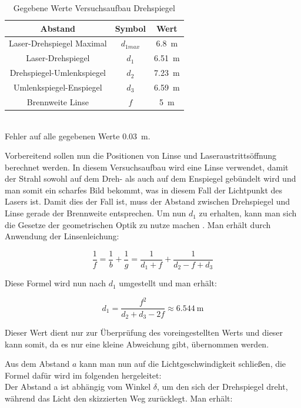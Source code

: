 \begin{table}[h]
    \centering
    \caption{Gegebene Werte Versuchsaufbau Drehspiegel}
    \begin{tabular}{c c c}
    \hline
    Abstand & Symbol & Wert \\
    \hline
    Laser-Drehspiegel Maximal & $d_{1max}$ & \SI{6.8}{\metre} \\
    Laser-Drehspiegel & $d_1$ & \SI{6.51}{\metre}\\
    Drehspiegel-Umlenkspiegel & $d_2$ & \SI{7.23}{\metre}\\
    Umlenkspiegel-Enspiegel & $d_3$ & \SI{6.59}{\metre}\\
    Brennweite Linse & $f$ & \SI{5}{\metre}\\
    
    \hline
    \end{tabular}
    \label{tab:Drehspiegel vorgegebene Werte}\\
    Fehler auf alle gegebenen Werte \SI{0.03}{\metre}.
\end{table}

Vorbereitend sollen nun die Positionen von Linse und Laseraustrittsöffnung berechnet werden. In diesem Versuchsaufbau wird eine Linse verwendet, damit der Strahl sowohl auf dem Dreh- als auch auf dem Enspiegel gebündelt wird und man somit ein scharfes Bild bekommt, was in diesem Fall der Lichtpunkt des Lasers ist. Damit dies der Fall ist, muss der Abstand zwischen Drehspiegel und Linse gerade der Brennweite entsprechen. Um nun $d_1$ zu erhalten, kann man sich die Gesetze der geometrischen Optik zu nutze machen \cite{2}. Man erhält durch Anwendung der Linsenleichung: 

\begin{equation}
    \frac{1}{f} = \frac{1}{b} + \frac{1}{g} = \frac{1}{d_1 + f} + \frac{1}{d_2 - f + d_3}
\end{equation}

Diese Formel wird nun nach $d_1$ umgestellt und man erhält:

\begin{equation}
    d_1 = \frac{f^2}{d_2+d_3-2f} \approx \SI{6.544}{\metre}
\end{equation}

Dieser Wert dient nur zur Überprüfung des voreingestellten Werts und dieser kann somit, da es nur eine kleine Abweichung gibt, übernommen werden.

Aus dem Abstand $a$ kann man nun auf die Lichtgeschwindigkeit schließen, die Formel dafür wird im folgenden hergeleitet:\\
Der Abstand a ist abhängig vom Winkel $\delta$, um den sich der Drehspiegel dreht, während das Licht den skizzierten Weg zurücklegt. Man erhält:

